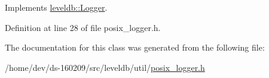 Implements \hyperlink{classleveldb_1_1_logger_a408e238a0028a45e9cc7aec6ad2277c5}{leveldb\+::\+Logger}.



Definition at line 28 of file posix\+\_\+logger.\+h.



The documentation for this class was generated from the following file\+:\begin{DoxyCompactItemize}
\item 
/home/dev/ds-\/160209/src/leveldb/util/\hyperlink{posix__logger_8h}{posix\+\_\+logger.\+h}\end{DoxyCompactItemize}
